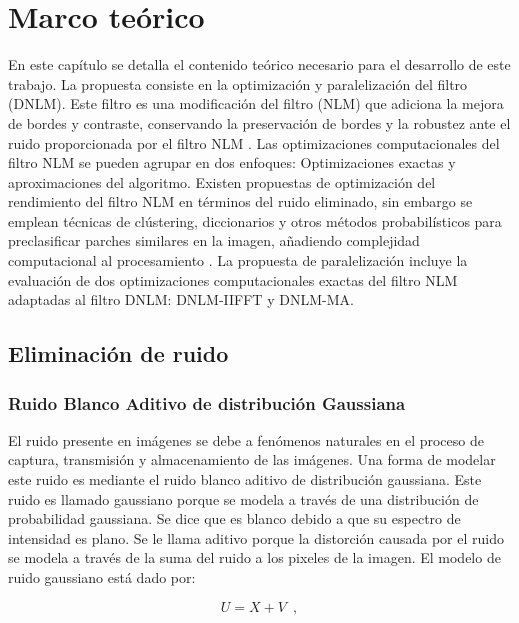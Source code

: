 \chapter{Marco teórico}
\label{ch:marco}


En este capítulo se detalla el contenido teórico necesario para el desarrollo de este trabajo. La propuesta consiste en la optimización y paralelización del filtro  (DNLM). Este filtro es una modificación del filtro  (NLM) que adiciona la mejora de bordes y contraste, conservando la preservación de bordes y la robustez ante el ruido proporcionada por el filtro NLM \cite{calderon2015dewaff}. 
Las optimizaciones computacionales del filtro NLM se pueden agrupar en dos enfoques: Optimizaciones exactas y aproximaciones del algoritmo. Existen propuestas de optimización del rendimiento del filtro NLM en términos del ruido eliminado, sin embargo se emplean técnicas de clústering, diccionarios y otros métodos probabilísticos para preclasificar parches similares en la imagen, a\~nadiendo complejidad computacional al procesamiento \cite{pardoNLM:2018,Chan2013,Tasdizen2009,Chatterjee2008,JI20091238,Karam2018}. 
La propuesta de paralelización incluye la evaluación de dos optimizaciones computacionales exactas del filtro NLM adaptadas al filtro DNLM: DNLM-IIFFT y DNLM-MA.



\section{Eliminación de ruido}

\subsection{Ruido Blanco Aditivo de distribución Gaussiana}
\label{ch:marco_agwn}

El ruido presente en im\'agenes se debe a fenómenos naturales en el proceso de captura, transmisión y almacenamiento de las im\'agenes. 	Una forma de modelar este ruido es mediante el ruido blanco aditivo de distribución gaussiana. Este ruido es llamado gaussiano porque se modela a través de una distribución de probabilidad gaussiana. Se dice que es blanco debido a que su espectro de intensidad es plano. Se le llama aditivo porque la distorción causada por el ruido se modela a través de la suma del ruido a los pixeles de la imagen. El modelo de ruido gaussiano  est\'a dado por:

\begin{equation}
\label{eq:modelruido}
U = X + V \enspace ,
\end{equation}

